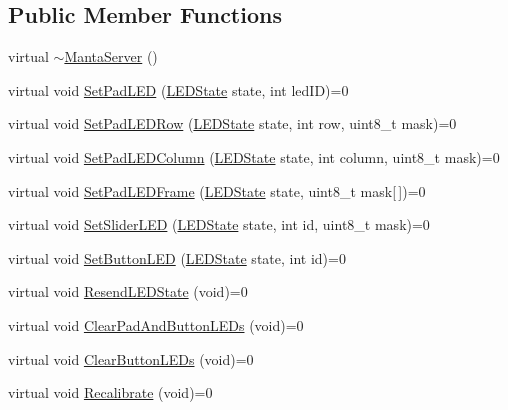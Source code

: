 \subsection*{\-Public \-Member \-Functions}
\begin{DoxyCompactItemize}
\item 
virtual \hyperlink{classMantaServer_a5a99da525e6e23f6114dce15ee97b72a}{$\sim$\-Manta\-Server} ()
\item 
virtual void \hyperlink{classMantaServer_acc71650a8cdab5c9d0408370978c8c39}{\-Set\-Pad\-L\-E\-D} (\hyperlink{classMantaServer_aefb7bb68319a53280ef9e9f84147288d}{\-L\-E\-D\-State} state, int led\-I\-D)=0
\item 
virtual void \hyperlink{classMantaServer_adcd2b175a3e35ac7cc1c59fef15c11d6}{\-Set\-Pad\-L\-E\-D\-Row} (\hyperlink{classMantaServer_aefb7bb68319a53280ef9e9f84147288d}{\-L\-E\-D\-State} state, int row, uint8\-\_\-t mask)=0
\item 
virtual void \hyperlink{classMantaServer_a6e1e9838d80b8303d49cf846afa2f96c}{\-Set\-Pad\-L\-E\-D\-Column} (\hyperlink{classMantaServer_aefb7bb68319a53280ef9e9f84147288d}{\-L\-E\-D\-State} state, int column, uint8\-\_\-t mask)=0
\item 
virtual void \hyperlink{classMantaServer_a2f02250f2cafd333cbc5b574b2d9c09b}{\-Set\-Pad\-L\-E\-D\-Frame} (\hyperlink{classMantaServer_aefb7bb68319a53280ef9e9f84147288d}{\-L\-E\-D\-State} state, uint8\-\_\-t mask\mbox{[}$\,$\mbox{]})=0
\item 
virtual void \hyperlink{classMantaServer_a8a20350aa6d784c0e7b60642afdd0c0c}{\-Set\-Slider\-L\-E\-D} (\hyperlink{classMantaServer_aefb7bb68319a53280ef9e9f84147288d}{\-L\-E\-D\-State} state, int id, uint8\-\_\-t mask)=0
\item 
virtual void \hyperlink{classMantaServer_ab4f3b02d6c91e253387c709bcd4a9388}{\-Set\-Button\-L\-E\-D} (\hyperlink{classMantaServer_aefb7bb68319a53280ef9e9f84147288d}{\-L\-E\-D\-State} state, int id)=0
\item 
virtual void \hyperlink{classMantaServer_a9d6664bb445e720b2dc1fe3554d370d5}{\-Resend\-L\-E\-D\-State} (void)=0
\item 
virtual void \hyperlink{classMantaServer_a3b8a0de3b2e6ec6ac80a4a07b0589057}{\-Clear\-Pad\-And\-Button\-L\-E\-Ds} (void)=0
\item 
virtual void \hyperlink{classMantaServer_a1c929d8dbd3bd45b635b427cf1e5ec93}{\-Clear\-Button\-L\-E\-Ds} (void)=0
\item 
virtual void \hyperlink{classMantaServer_af75ab0cd5a17619b740ce653660a5879}{\-Recalibrate} (void)=0

\end{DoxyCompactItemize}

